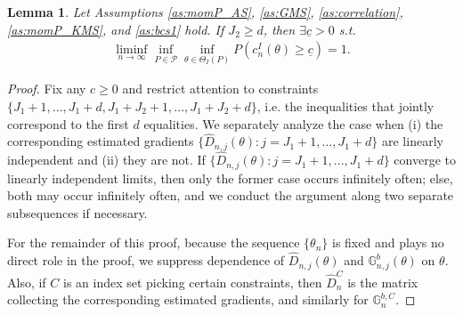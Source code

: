 \documentclass[letterpaper,11pt]{article}
\theoremstyle{myplain}
\newtheorem{lemma}{Lemma}[section]
\theoremstyle{mydefinition}
\theoremstyle{myremark}
\newcommand{\G}{\mathbb{G}}
\numberwithin{equation}{section}
\numberwithin{figure}{section}
\begin{document}
\begin{appendices}
\begin{lemma}\label{lem:cbd}
Let Assumptions \ref{as:momP_AS}, \ref{as:GMS}, \ref{as:correlation}, \ref{as:momP_KMS}, and \ref{as:bcs1} hold.  If $J_2 \ge d$, then $\exists \underline{c} >0$ s.t.
\begin{align*}
\liminf_{n \to\infty}\inf_{P\in\mathcal P}\inf_{\theta\in \Theta_I(P)}P(c^I_{n}(\theta)\ge \underline c)=1.  
\end{align*}
\end{lemma}
\begin{proof}
Fix any $c \geq 0$ and restrict attention to constraints $\{J_1+1,...,J_1+d,J_1+J_2+1,...,J_1+J_2+d\}$, i.e. the inequalities that jointly correspond to the first $d$ equalities. We separately analyze the case when (i) the corresponding estimated gradients $\{\hat{D}_{n,j}(\theta):j = J_1+1,...,J_1+d\}$ are linearly independent and (ii) they are not. If $\{\hat{D}_{n,j}(\theta):j = J_1+1,...,J_1+d\}$ converge to linearly independent limits, then only the former case occurs infinitely often; else, both may occur infinitely often, and we conduct the argument along two separate subsequences if necessary.

For the remainder of this proof, because the sequence $\{\theta_n\}$ is fixed and plays no direct role in the proof, we suppress dependence of $\hat{D}_{n,j}(\theta)$ and $\G^b_{n,j}(\theta)$ on $\theta$. Also, if $C$ is an index set picking certain constraints, then $\hat{D}_{n}^C$ is the matrix collecting the corresponding estimated gradients, and similarly for $\G_{n}^{b,C}$.


\end{proof}
\end{appendices}
\end{document}
